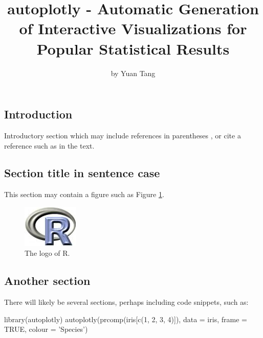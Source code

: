 \title{autoplotly - Automatic Generation of Interactive Visualizations for
Popular Statistical Results}
\author{by Yuan Tang}

\maketitle


\subsection{Introduction}\label{introduction}

Introductory section which may include references in parentheses
\citep{R}, or cite a reference such as \citet{R} in the text.

\subsection{Section title in sentence
case}\label{section-title-in-sentence-case}

This section may contain a figure such as Figure \ref{figure:rlogo}.

\begin{figure}[htbp]
  \centering
  \includegraphics{Rlogo}
  \caption{The logo of R.}
  \label{figure:rlogo}
\end{figure}

\subsection{Another section}\label{another-section}

There will likely be several sections, perhaps including code snippets,
such as:

\begin{Schunk}
\begin{Sinput}
library(autoplotly)
autoplotly(prcomp(iris[c(1, 2, 3, 4)]), data = iris, frame = TRUE, colour = 'Species')
\end{Sinput}
\end{Schunk}

